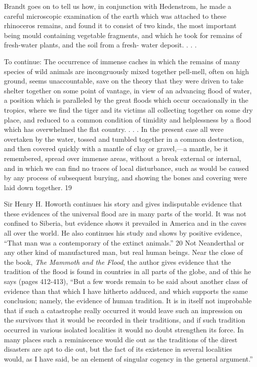 Brandt goes on to tell us how, in conjunction with Hedenstrom, he made a careful
microscopic examination of the earth which was attached to these rhinoceros remains, and
found it to consist of two kinds, the most important being mould containing vegetable
fragments, and which he took for remains of fresh-water plants, and the soil from a fresh-
water deposit. . . .

To continue: The occurrence of immense caches in which the remains of many species of
wild animals are incongruously mixed together pell-mell, often on high ground, seems
unaccountable, save on the theory that they were driven to take shelter together on some
point of vantage, in view of an advancing flood of water, a position which is paralleled by the
great floods which occur occasionally in the tropics, where we find the tiger and its victims
all collecting together on some dry place, and reduced to a common condition of timidity and
helplessness by a flood which has overwhelmed the flat country. . . . In the present case all
were overtaken by the water, tossed and tumbled together in a common destruction, and then
covered quickly with a mantle of clay or gravel,—a mantle, be it remembered, spread over
immense areas, without a break external or internal, and in which we can find no traces of
local disturbance, such as would be caused by any process of subsequent burying, and
showing the bones and covering were laid down together. 19

Sir Henry H. Howorth continues his story and gives indisputable evidence that these
evidences of the universal flood are in many parts of the world. It was not confined to
Siberia, but evidence shows it prevailed in America and in the caves all over the world. He
also continues his study and shows by positive evidence, ``That man was a contemporary of
the extinct animals.'' 20 Not Neanderthal or any other kind of manufactured man, but real
human beings. Near the close of the book, \textit{The Mammoth and the Flood}, the author gives
evidence that the tradition of the flood is found in countries in all parts of the globe, and of
this he says (pages 412-413), ``But a few words remain to be said about another class of
evidence than that which I have hitherto adduced, and which supports the same conclusion;
namely, the evidence of human tradition. It is in itself not improbable that if such a
catastrophe really occurred it would leave such an impression on the survivors that it would
be recorded in their traditions, and if such tradition occurred in various isolated localities it
would no doubt strengthen its force. In many places such a reminiscence would die out as the
traditions of the direst disasters are apt to die out, but the fact of its existence in several
localities would, as I have said, be an element of singular cogency in the general argument.''

